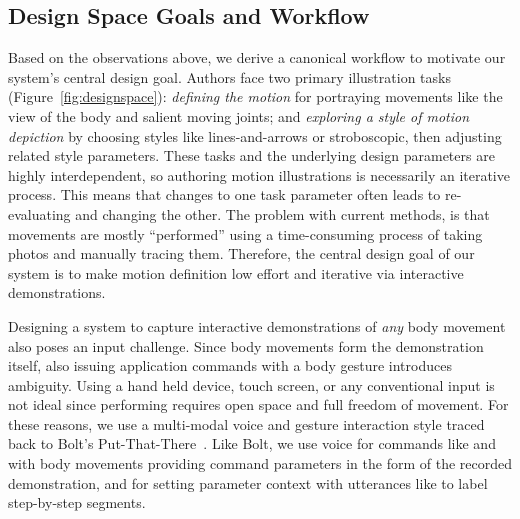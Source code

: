 \subsection{Design Space Goals and Workflow}

Based on the observations above, we derive a canonical workflow to motivate our system's central design goal.
Authors face two primary illustration tasks (Figure~\ref{fig:designspace}):
\textit{defining the motion} for portraying movements like the view of the body and salient moving joints;
and \textit{exploring a style of motion depiction} by choosing styles like lines-and-arrows or stroboscopic, then adjusting related style parameters.
These tasks and the underlying design parameters are highly interdependent, so authoring motion illustrations is necessarily an iterative process.
This means that changes to one task parameter often leads to re-evaluating and changing the other.
The problem with current methods, is that movements are mostly ``performed'' using a time-consuming process of taking photos and manually tracing them.
%
Therefore, the central design goal of our system is to make motion definition low effort and iterative via interactive demonstrations.

Designing a system to capture interactive demonstrations of \textit{any} body movement also poses an input challenge.
Since  body movements form the demonstration itself, also issuing application commands with a body gesture introduces ambiguity.
Using a hand held device, touch screen, or any conventional input is not ideal since performing requires open space and full freedom of movement.
For these reasons, we use a multi-modal voice and gesture interaction style traced back to Bolt's Put-That-There~\cite{Bolt:1980:PutThatThere}. Like Bolt, we use voice for commands like  and  with body movements providing command parameters in the form of the recorded demonstration, and for setting parameter context with utterances like  to label step-by-step segments.

